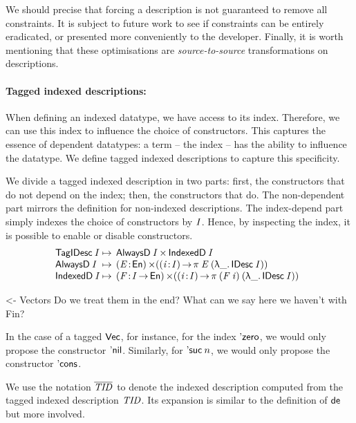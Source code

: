 We should precise that forcing a description is not guaranteed to
remove all constraints. It is subject to future work to see if
constraints can be entirely eradicated, or presented more conveniently
to the developer.  Finally, it is worth mentioning that these
optimisations are \emph{source-to-source} transformations on
descriptions.

\paragraph{Tagged indexed descriptions:}

When defining an indexed datatype, we have access to its
index. Therefore, we can use this index to influence the choice of
constructors. This captures the essence of dependent datatypes: a
term -- the index -- has the ability to influence the datatype. We
define tagged indexed descriptions to capture this specificity.

We divide a tagged indexed description in two parts: first, the
constructors that do not depend on the index; then, the constructors
that do. The non-dependent part mirrors the definition for non-indexed
descriptions. The index-depend part simply indexes the choice of
constructors by $\V{I}$. Hence, by inspecting the index, it is
possible to enable or disable constructors.
%
\[
\begin{array}{@{}l@{\:\mapsto\:\:}l}
 \TagIDesc{\V{I}}  & \TIMES{\ATagIDesc{\V{I}}}{\ITagIDesc{\V{I}}} \\
 \ATagIDesc{\V{I}} & \SIGMA{\V{E}}{\EnumU} (\PI{\V{i}}{\V{I}} \spi{\V{E}}{(\LAM{\_} \IDesc{\V{I}})}) \\
 \ITagIDesc{\V{I}} & 
     \SIGMA{\V{F}}{\V{I} \To \EnumU} (\PI{\V{i}}{\V{I}} \spi{(\V{F}\: \V{i})}{(\LAM{\_} \IDesc{\V{I}})}) 
\end{array}
\]

\begin{wstructure}
<- Vectors
    Do we treat them in the end? 
    What can we say here we haven't with Fin?
\end{wstructure}

In the case of a tagged $\D{Vec}$, for instance, for the index
$\NatZero$, we would only propose the constructor
$\ListNil$. Similarly, for $\NatSuc{n}$, we would only propose the
constructor $\SYMBListCons$.

We use the notation $\toIDesc{\V{TID}}$ to denote the
indexed description computed from the tagged indexed description
$\V{TID}$. Its expansion is similar to the definition of \(\SYMBtoDesc\)
but more involved.
 
